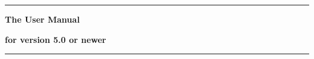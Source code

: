 \thispagestyle{empty}
\begin{titlepage}


\rule{\linewidth}{0.5mm}
  \Large
  \textbf{The \aevol{} User Manual}

  \vspace{0.5cm}
   
  \normalsize
  \textbf{for version 5.0 or newer}

 \rule{\linewidth}{0.5mm}
 
\end{titlepage}

\clearemptydoublepage
